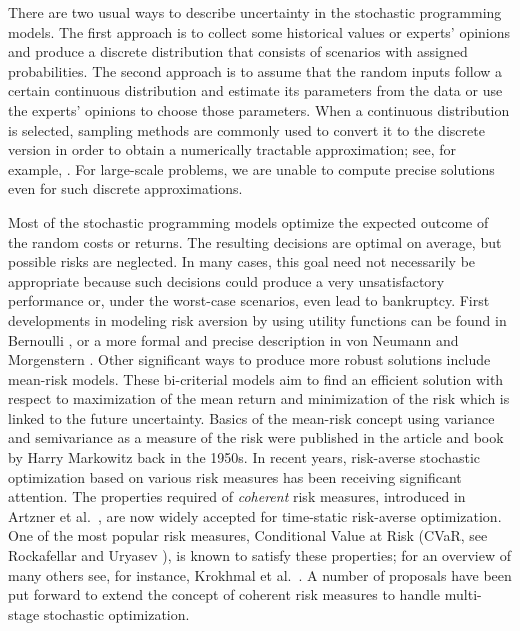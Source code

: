 \documentclass{article}              %
\begin{document}
There are two usual ways to describe uncertainty in the stochastic programming models. The first approach is to collect some historical values or experts' opinions and produce a discrete distribution that consists of scenarios with assigned probabilities. The second approach is to assume that the random inputs follow a certain continuous distribution and estimate its parameters from the data or use the experts' opinions to choose those parameters. When a continuous distribution is selected, sampling methods are commonly used to convert it to the discrete version in order to obtain a numerically tractable approximation; see, for example, \cite{pflug2014multistage}. For large-scale problems, we are unable to compute precise solutions even for such discrete approximations. 

Most of the stochastic programming models optimize the expected outcome of the random costs or returns. The resulting decisions are optimal on average, but possible risks are neglected. In many cases, this goal need not necessarily be appropriate because such decisions could produce a very unsatisfactory performance or, under the worst-case scenarios, even lead to bankruptcy. First developments in modeling risk aversion by using utility functions can be found in Bernoulli \cite{bernoulli}, or a more formal and precise description in von Neumann and Morgenstern \cite{neumann}. Other significant ways to produce more robust solutions include mean-risk models. These bi-criterial models aim to find an efficient solution with respect to maximization of the mean return and minimization of the risk which is linked to the future uncertainty. Basics of the mean-risk concept using variance and semivariance as a measure of the risk were published in the article \cite{markowitz_artic} and  book \cite{markowitz_book}  by Harry Markowitz back in the 1950s. In recent years, risk-averse stochastic optimization based on various risk measures has been receiving significant attention. The properties required of {\em coherent} risk measures, introduced in Artzner et al.\ \cite{artzner_99}, are now widely accepted for time-static risk-averse optimization. One of the most popular risk measures, Conditional Value at Risk (CVaR, see Rockafellar and Uryasev \cite{rockafellar2002conditional}), is known to satisfy these properties; for an overview of many others see, for instance, Krokhmal et al.\ \cite{K-U-Z}. A number of proposals have been put forward to extend the concept of coherent risk measures to handle multi-stage stochastic optimization.
\end{document}
